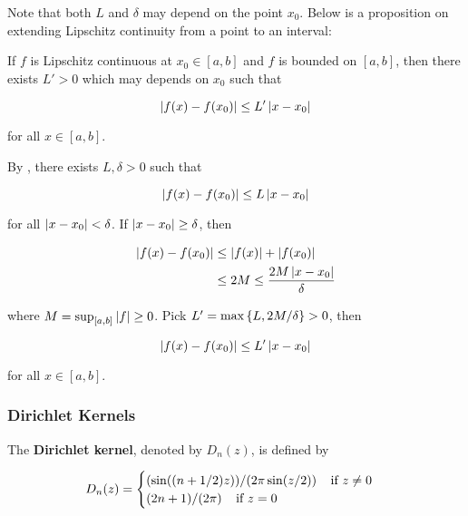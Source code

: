 \documentclass[a4paper,12pt]{article}
\begin{document}
Note that both $L$ and $\delta$ may depend on the point $x_{0}$. Below is a proposition on extending Lipschitz continuity from a point to an interval:\n

\begin{pst}
  If $f$ is Lipschitz continuous at $x_{0}\in[a,b]$ and $f$ is bounded on $[a,b]$, then there exists $L'>0$ which may depends on $x_{0}$ such that

$$\left| f(x)-f(x_{0})\right|\leq L'\left| x-x_{0}\right|$$\s

for all $x\in[a,b]$.\n

\prf By \rdft[\sctr{1}], there exists $L,\delta>0$ such that

$$\left| f(x)-f(x_{0})\right|\leq L\left| x-x_{0}\right|$$\s

for all $\left| x-x_{0}\right|<\delta$. If $\left| x-x_{0}\right|\geq\delta$, then

$$\begin{aligned}[t]
  \left| f(x)-f(x_{0})\right|&\leq\left| f(x)\right|+\left| f(x_{0})\right|\\
  &\leq 2M\leq \frac{2M\left| x-x_{0}\right|}{\delta}
\end{aligned}$$\s

where $M=\sup_{[a,b]}\left| f\right|\geq 0$. Pick $L'=\max\left\{ L,2M/\delta\right\}>0$, then

$$\left| f(x)-f(x_{0})\right|\leq L'\left| x-x_{0}\right|$$\s

for all $x\in[a,b]$.
\end{pst}

\subsubsection{Dirichlet Kernels}
\begin{dft}
  The \textbf{Dirichlet kernel}, denoted by $D_{n}(z)$, is defined by

  $$D_{n}(z)=\begin{cases}
    (\sin((n+1/2)z))/(2\pi\sin(z/2))\;\;\;\;\text{if }z\neq 0\\
    (2n+1)/(2\pi)\;\;\;\;\text{if }z=0
  \end{cases}$$
\end{dft}\n
\end{document}
